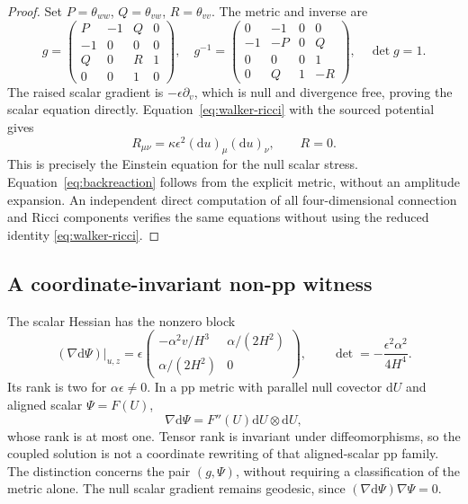 \documentclass[11pt]{article}
\newcommand{\dd}{\mathrm d}
\begin{document}
\begin{proof}
Set \(P=\theta_{ww}\), \(Q=\theta_{vw}\), \(R=\theta_{vv}\).
The metric and inverse are
\begin{equation}
 g=\begin{pmatrix}P&-1&Q&0\\-1&0&0&0\\Q&0&R&1\\0&0&1&0\end{pmatrix},\quad
 g^{-1}=\begin{pmatrix}0&-1&0&0\\-1&-P&0&Q\\0&0&0&1\\0&Q&1&-R\end{pmatrix},\quad
 \det g=1.
 \label{eq:finite-inverse}
\end{equation}
The raised scalar gradient is \(-\epsilon\partial_v\), which is null and divergence free, proving the scalar equation directly.
Equation~\eqref{eq:walker-ricci} with the sourced potential gives
\begin{equation}
 R_{\mu\nu}=\kappa\epsilon^2(\dd u)_\mu(\dd u)_\nu,\qquad R=0.
 \label{eq:finite-einstein}
\end{equation}
This is precisely the Einstein equation for the null scalar stress.
Equation~\eqref{eq:backreaction} follows from the explicit metric, without an amplitude expansion.
An independent direct computation of all four-dimensional connection and Ricci components verifies the same equations without using the reduced identity \eqref{eq:walker-ricci}.
\end{proof}

\subsection{A coordinate-invariant non-pp witness}

The scalar Hessian has the nonzero block
\begin{equation}
 (\nabla\dd\Psi)\big|_{u,z}
 =\epsilon\begin{pmatrix}
 -\alpha^2v/H^3&\alpha/(2H^2)\\\alpha/(2H^2)&0
 \end{pmatrix},\qquad
 \det=-\frac{\epsilon^2\alpha^2}{4H^4}.
 \label{eq:hessian-rank}
\end{equation}
Its rank is two for \(\alpha\epsilon\ne0\).
In a pp metric with parallel null covector \(\dd U\) and aligned scalar \(\Psi=F(U)\),
\begin{equation}
 \nabla\dd\Psi=F''(U)\dd U\otimes\dd U,
 \label{eq:pp-hessian}
\end{equation}
whose rank is at most one.
Tensor rank is invariant under diffeomorphisms, so the coupled solution is not a coordinate rewriting of that aligned-scalar pp family.
The distinction concerns the pair \((g,\Psi)\), without requiring a classification of the metric alone.
The null scalar gradient remains geodesic, since \((\nabla\dd\Psi)\nabla\Psi=0\).
\end{document}
